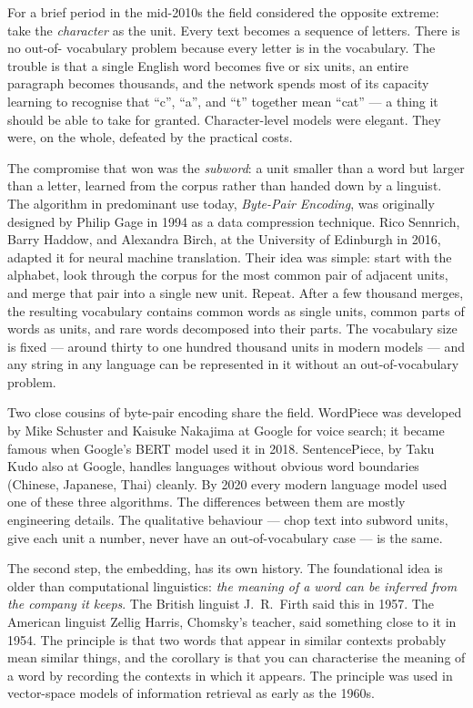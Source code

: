 For a brief period in the mid-2010s the field considered the
opposite extreme: take the \emph{character} as the unit. Every
text becomes a sequence of letters. There is no out-of-
vocabulary problem because every letter is in the vocabulary.
The trouble is that a single English word becomes five or six
units, an entire paragraph becomes thousands, and the network
spends most of its capacity learning to recognise that
``c'', ``a'', and ``t'' together mean ``cat'' --- a thing it
should be able to take for granted. Character-level models were
elegant. They were, on the whole, defeated by the practical
costs.

The compromise that won was the \emph{subword}: a unit smaller
than a word but larger than a letter, learned from the corpus
rather than handed down by a linguist. The algorithm in
predominant use today, \emph{Byte-Pair Encoding}, was originally
designed by Philip Gage in 1994 as a data compression technique.
Rico Sennrich, Barry Haddow, and Alexandra Birch, at the
University of Edinburgh in 2016, adapted it for neural machine
translation. Their idea was simple: start with the alphabet,
look through the corpus for the most common pair of adjacent
units, and merge that pair into a single new unit. Repeat. After
a few thousand merges, the resulting vocabulary contains
common words as single units, common parts of words as units,
and rare words decomposed into their parts. The vocabulary
size is fixed --- around thirty to one hundred thousand units
in modern models --- and any string in any language can be
represented in it without an out-of-vocabulary problem.

Two close cousins of byte-pair encoding share the field.
WordPiece was developed by Mike Schuster and Kaisuke Nakajima
at Google for voice search; it became famous when Google's BERT
model used it in 2018. SentencePiece, by Taku Kudo also at
Google, handles languages without obvious word boundaries
(Chinese, Japanese, Thai) cleanly. By 2020 every modern
language model used one of these three algorithms. The
differences between them are mostly engineering details. The
qualitative behaviour --- chop text into subword units, give
each unit a number, never have an out-of-vocabulary case --- is
the same.

The second step, the embedding, has its own history. The
foundational idea is older than computational linguistics:
\emph{the meaning of a word can be inferred from the company
it keeps}. The British linguist J.~R.~Firth said this in 1957.
The American linguist Zellig Harris, Chomsky's teacher, said
something close to it in 1954. The principle is that two
words that appear in similar contexts probably mean similar
things, and the corollary is that you can characterise the
meaning of a word by recording the contexts in which it
appears. The principle was used in vector-space models of
information retrieval as early as the 1960s.

